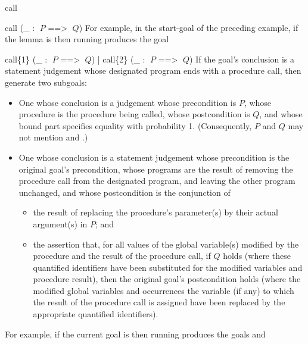 \begin{tactic}{call}
\begin{tsyntax}{call (_ : $\;P$ ==> $\;Q$)}
  \medskip
  For example, in the start-goal of the preceding example,
  if the lemma  is
  then running
   produces the
  goal 
  \end{tsyntax}

  \begin{tsyntax}{call\{1\} (_ : $\;P$ ==> $\;Q$) | call\{2\} (_ : $\;P$ ==> $\;Q$)}
    If the goal's conclusion is a \prhl statement judgement whose
    designated program ends with a procedure call, then generate two
    subgoals:
  \begin{itemize}
  \item One whose conclusion is a \phl judgement whose precondition is
    $P$, whose procedure is the procedure being called, whose
    postcondition is $Q$, and whose bound part specifies equality with
    probability 1.
    (Consequently, $P$ and $Q$ may not mention  and
    .)

  \item One whose conclusion is a \prhl statement judgement whose
    precondition is the original goal's precondition, whose programs
    are the result of removing the procedure call from the designated
    program, and leaving the other program unchanged, and whose
    postcondition is the conjunction of
    \begin{itemize}
    \item the result of replacing the procedure's
      parameter(s) by their actual argument(s) in $P$; and

    \item the assertion that, for all values of the global variable(s)
      modified by the procedure and the result of the procedure call,
      if $Q$ holds (where these quantified identifiers have been
      substituted for the modified variables and procedure result),
      then the original goal's postcondition holds (where the modified
      global variables and occurrences the variable (if any) to which
      the result of the procedure call is assigned have been replaced
      by the appropriate quantified identifiers).
    \end{itemize}
  \end{itemize}

  For example, if the current goal is
  then running
   produces the
  goals  and


\end{tsyntax}
\end{tactic}

